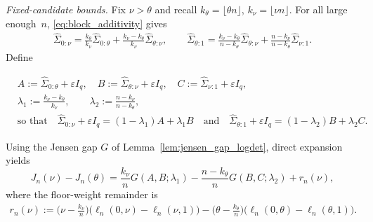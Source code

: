\documentclass[10pt, letterpaper]{amsart}
\newif\ifwidedisplays
\begin{document}
\medskip
\noindent\emph{Fixed-candidate bounds.}
Fix $\nu>\theta$ and recall $k_\theta=\lfloor\theta n\rfloor$, $k_\nu=\lfloor\nu n\rfloor$.
For all large enough~$n$,  \eqref{eq:block_additivity} gives
\begin{align}\label{equ:decomp_empirical_second_moments}
\widehat\Sigma_{0:\nu}
=\frac{k_\theta}{k_\nu}\widehat\Sigma_{0:\theta}
+\frac{k_\nu-k_\theta}{k_\nu}\widehat\Sigma_{\theta:\nu},
\qquad
\widehat\Sigma_{\theta:1}
=\frac{k_\nu-k_\theta}{n-k_\theta}\widehat\Sigma_{\theta:\nu}
+\frac{n-k_\nu}{n-k_\theta}\widehat\Sigma_{\nu:1}.
\end{align}
Define
\ifwidedisplays
\begin{align*}
&A:=\widehat\Sigma_{0:\theta}+\varepsilon I_q,\quad
B:=\widehat\Sigma_{\theta:\nu}+\varepsilon I_q,\quad
C:=\widehat\Sigma_{\nu:1}+\varepsilon I_q,\qquad
\lambda_1:=\frac{k_\nu-k_\theta}{k_\nu},\quad
\lambda_2:=\frac{n-k_\nu}{n-k_\theta},\\
&\text{so that}\quad
\widehat\Sigma_{0:\nu}+\varepsilon I_q=(1-\lambda_1)A+\lambda_1B
\quad\text{and}\quad
\widehat\Sigma_{\theta:1}+\varepsilon I_q=(1-\lambda_2)B+\lambda_2C.
\end{align*}
\else
\begin{align*}
&A:=\widehat\Sigma_{0:\theta}+\varepsilon I_q,\quad
B:=\widehat\Sigma_{\theta:\nu}+\varepsilon I_q,\quad
C:=\widehat\Sigma_{\nu:1}+\varepsilon I_q,\\
&\lambda_1:=\frac{k_\nu-k_\theta}{k_\nu},\qquad
\lambda_2:=\frac{n-k_\nu}{n-k_\theta},\\
&\text{so that}\quad
\widehat\Sigma_{0:\nu}+\varepsilon I_q=(1-\lambda_1)A+\lambda_1B
\quad\text{and}\quad
\widehat\Sigma_{\theta:1}+\varepsilon I_q=(1-\lambda_2)B+\lambda_2C.
\end{align*}
\fi
Using the Jensen gap $G$ of Lemma~\ref{lem:jensen_gap_logdet}, direct
expansion yields
\begin{equation}\label{eq:two-gap}
J_n(\nu)-J_n(\theta)
=\frac{k_\nu}{n}G(A,B;\lambda_1)
-\frac{n-k_\theta}{n}G(B,C;\lambda_2)
+r_n(\nu),
\end{equation}
where the floor-weight remainder is
\begin{align}\label{eq:two-gap-remainder}
r_n(\nu)
:=\Big(\nu-\frac{k_\nu}{n}\Big)
\bigl(\ell_n(0,\nu)-\ell_n(\nu,1)\bigr)
-\Big(\theta-\frac{k_\theta}{n}\Big)
\bigl(\ell_n(0,\theta)-\ell_n(\theta,1)\bigr).
\end{align}
\end{document}
